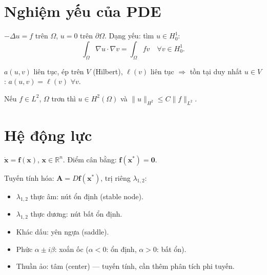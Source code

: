 \documentclass[12pt,a4paper]{article}
\begin{document}
\section{Nghiệm yếu của PDE}

\begin{dinhnghia}[title={Dạng biến phân}]
  $-\Delta u = f$ trên $\Omega$, $u = 0$ trên $\partial\Omega$. Dạng yếu: tìm $u \in H^1_0$:
  \[
    \int_\Omega \nabla u \cdot \nabla v = \int_\Omega fv \quad \forall v \in H^1_0.
  \]
\end{dinhnghia}

\begin{dinhly}[title={Lax--Milgram}]
  $a(u,v)$ liên tục, ép trên $V$ (Hilbert), $\ell(v)$ liên tục $\Rightarrow$ tồn tại duy nhất $u \in V$: $a(u,v) = \ell(v)$ $\forall v$.
\end{dinhly}

\begin{dinhly}[title={Tính chính quy}]
  Nếu $f \in L^2$, $\Omega$ trơn thì $u \in H^2(\Omega)$ và $\|u\|_{H^2} \le C\|f\|_{L^2}$.
\end{dinhly}

\section{Hệ động lực}

\begin{dinhnghia}[title={Hệ tự trị}]
  $\dot{\mathbf{x}} = \mathbf{f}(\mathbf{x})$, $\mathbf{x} \in \mathbb{R}^n$. Điểm cân bằng: $\mathbf{f}(\mathbf{x}^*) = \mathbf{0}$.
\end{dinhnghia}

\begin{dinhnghia}[title={Phân loại (2D)}]
  Tuyến tính hóa: $\mathbf{A} = D\mathbf{f}(\mathbf{x}^*)$, trị riêng $\lambda_{1,2}$:
  \begin{itemize}
    \item $\lambda_{1,2}$ thực âm: nút ổn định (stable node).
    \item $\lambda_{1,2}$ thực dương: nút bất ổn định.
    \item Khác dấu: yên ngựa (saddle).
    \item Phức $\alpha \pm i\beta$: xoắn ốc ($\alpha < 0$: ổn định, $\alpha > 0$: bất ổn).
    \item Thuần ảo: tâm (center) --- tuyến tính, cần thêm phân tích phi tuyến.
  \end{itemize}
\end{dinhnghia}
\end{document}
